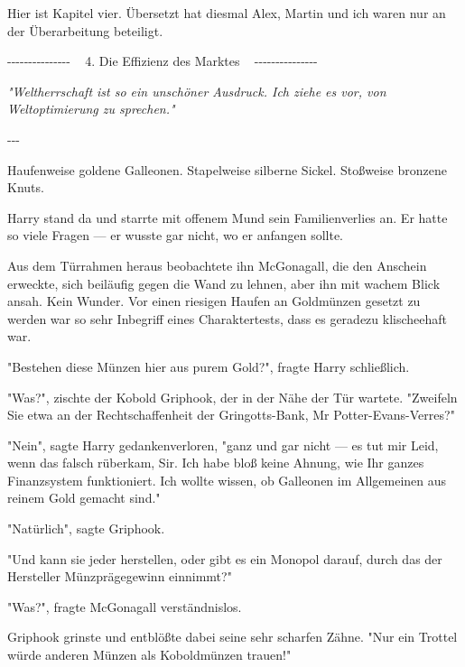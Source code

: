 

\hypertarget{die-effizienz-des-marktes}{%

Hier ist Kapitel vier. Übersetzt hat diesmal Alex, Martin und ich waren nur an der Überarbeitung beteiligt.

-\/-\/-\/-\/-\/-\/-\/-\/-\/-\/-\/-\/-\/-\/- ~ 4. Die Effizienz des Marktes ~ -\/-\/-\/-\/-\/-\/-\/-\/-\/-\/-\/-\/-\/-\/-

\emph{"Weltherrschaft ist so ein unschöner Ausdruck. Ich ziehe es vor, von Weltoptimierung zu sprechen."}

-\/-\/-

Haufenweise goldene Galleonen. Stapelweise silberne Sickel. Stoßweise bronzene Knuts.

Harry stand da und starrte mit offenem Mund sein Familienverlies an. Er hatte so viele Fragen --- er wusste gar nicht, wo er anfangen sollte.

Aus dem Türrahmen heraus beobachtete ihn McGonagall, die den Anschein erweckte, sich beiläufig gegen die Wand zu lehnen, aber ihn mit wachem Blick ansah. Kein Wunder. Vor einen riesigen Haufen an Goldmünzen gesetzt zu werden war so sehr Inbegriff eines Charaktertests, dass es geradezu klischeehaft war.

"Bestehen diese Münzen hier aus purem Gold?", fragte Harry schließlich.

"Was?", zischte der Kobold Griphook, der in der Nähe der Tür wartete. "Zweifeln Sie etwa an der Rechtschaffenheit der Gringotts-Bank, Mr Potter-Evans-Verres?"

"Nein", sagte Harry gedankenverloren, "ganz und gar nicht --- es tut mir Leid, wenn das falsch rüberkam, Sir. Ich habe bloß keine Ahnung, wie Ihr ganzes Finanzsystem funktioniert. Ich wollte wissen, ob Galleonen im Allgemeinen aus reinem Gold gemacht sind."

"Natürlich", sagte Griphook.

"Und kann sie jeder herstellen, oder gibt es ein Monopol darauf, durch das der Hersteller Münzprägegewinn einnimmt?"

"Was?", fragte McGonagall verständnislos.

Griphook grinste und entblößte dabei seine sehr scharfen Zähne. "Nur ein Trottel würde anderen Münzen als Koboldmünzen trauen!"

}
